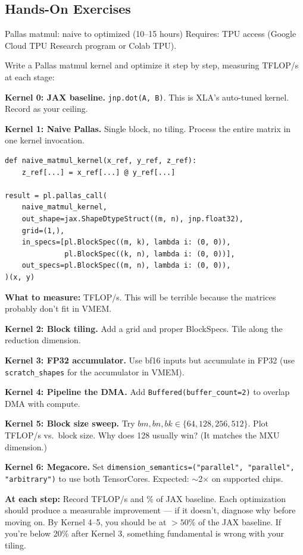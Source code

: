 \subsection{Hands-On Exercises}

\begin{exercise}{Pallas matmul: naive to optimized (10--15 hours)}
Requires: TPU access (Google Cloud TPU Research program or Colab TPU).

Write a Pallas matmul kernel and optimize it step by step, measuring TFLOP/s at each stage:

\textbf{Kernel 0: JAX baseline.} \texttt{jnp.dot(A, B)}. This is XLA's auto-tuned kernel. Record as your ceiling.

\textbf{Kernel 1: Naive Pallas.} Single block, no tiling. Process the entire matrix in one kernel invocation.
\begin{lstlisting}
def naive_matmul_kernel(x_ref, y_ref, z_ref):
    z_ref[...] = x_ref[...] @ y_ref[...]

result = pl.pallas_call(
    naive_matmul_kernel,
    out_shape=jax.ShapeDtypeStruct((m, n), jnp.float32),
    grid=(1,),
    in_specs=[pl.BlockSpec((m, k), lambda i: (0, 0)),
              pl.BlockSpec((k, n), lambda i: (0, 0))],
    out_specs=pl.BlockSpec((m, n), lambda i: (0, 0)),
)(x, y)
\end{lstlisting}

\textbf{What to measure:} TFLOP/s. This will be terrible because the matrices probably don't fit in VMEM.

\textbf{Kernel 2: Block tiling.} Add a grid and proper BlockSpecs. Tile along the reduction dimension.

\textbf{Kernel 3: FP32 accumulator.} Use bf16 inputs but accumulate in FP32 (use \texttt{scratch\_shapes} for the accumulator in VMEM).

\textbf{Kernel 4: Pipeline the DMA.} Add \texttt{Buffered(buffer\_count=2)} to overlap DMA with compute.

\textbf{Kernel 5: Block size sweep.} Try $bm, bn, bk \in \{64, 128, 256, 512\}$. Plot TFLOP/s vs.\ block size. Why does 128 usually win? (It matches the MXU dimension.)

\textbf{Kernel 6: Megacore.} Set \texttt{dimension\_semantics=("parallel", "parallel", "arbitrary")} to use both TensorCores. Expected: $\sim$2$\times$ on supported chips.

\textbf{At each step:} Record TFLOP/s and \% of JAX baseline. Each optimization should produce a measurable improvement --- if it doesn't, diagnose why before moving on. By Kernel 4--5, you should be at $>50\%$ of the JAX baseline. If you're below 20\% after Kernel 3, something fundamental is wrong with your tiling.
\end{exercise}


